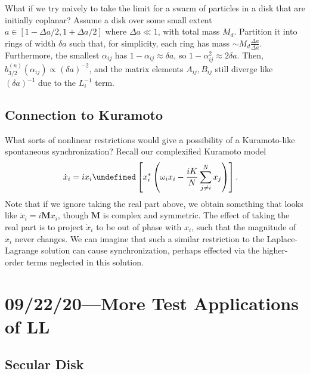 \documentclass[11pt,
        usenames, %
        dvipsnames %
    ]{article}
\newcommand*{\bm}[1]{\boldsymbol{\mathbf{#1}}}
\newcommand*{\p}[1]{\left(#1\right)}
\newcommand*{\s}[1]{\left[#1\right]}
\let\Re\undefined
\DeclareMathOperator{\Re}{Re}
\begin{document}
What if we try naively to take the limit for a swarm of particles in a disk that
are initially coplanar? Assume a disk over some small extent $a \in [1 - \Delta
a / 2, 1 + \Delta a / 2]$ where $\Delta a \ll 1$, with total mass $M_d$.
Partition it into rings of width $\delta a$ such that, for simplicity, each ring
has mass $\sim M_d\frac{\Delta a}{\Delta a}$. Furthermore, the smallest
$\alpha_{ij}$ has $1 - \alpha_{ij} \approx \delta a$, so $1 - \alpha_{ij}^2
\approx 2\delta a$. Then, $b_{3/2}^{(n)}\p{\alpha_{ij}} \propto \p{\delta
a}^{-2}$, and the matrix elements $A_{ij}, B_{ij}$ still diverge like $\p{\delta
a}^{-1}$ due to the $L_i^{-1}$ term.

\subsection{Connection to Kuramoto}

What sorts of nonlinear restrictions would give a possibility of a Kuramoto-like
spontaneous synchronization? Recall our complexified Kuramoto model
\begin{align}
    \dot{x}_i &= ix_i \Re\s{x_i^*\p{\omega_i x_i - \frac{iK}{N}
            \sum\limits_{j \neq i}^N x_j}}.
\end{align}
Note that if we ignore taking the real part above, we obtain something that
looks like $\dot{x}_i = i\bm{M} x_i$, though $\bm{M}$ is complex and symmetric.
The effect of taking the real part is to project $\dot{x}_i$ to be out of phase
with $x_i$, such that the magnitude of $x_i$ never changes. We can imagine that
such a similar restriction to the Laplace-Lagrange solution can cause
synchronization, perhaps effected via the higher-order terms neglected in this
solution.

\section{09/22/20---More Test Applications of LL}

\subsection{Secular Disk}
\end{document}
